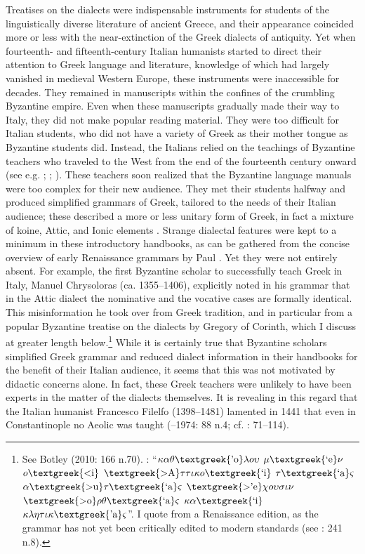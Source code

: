 Treatises on the dialects were indispensable instruments for students of the linguistically diverse literature of ancient Greece, and their appearance coincided more or less with the near-extinction of the Greek dialects of antiquity. Yet when fourteenth- and fifteenth-century Italian humanists started to direct their attention to Greek language and literature, knowledge of which had largely vanished in medieval Western Europe, these instruments were inaccessible for decades. They remained in manuscripts within the confines of the crumbling Byzantine empire. Even when these manuscripts gradually made their way to Italy, they did not make popular reading material. They were too difficult for Italian students, who did not have a variety of Greek as their mother tongue as Byzantine students did. Instead, the Italians relied on the teachings of Byzantine teachers who traveled to the West from the end of the fourteenth century onward (see e.g. \citealt{Harris1995}; \citealt{Botley2010}; \citealt{Wilson2016}). These teachers soon realized that the Byzantine language manuals were too complex for their new audience. They met their students halfway and produced simplified grammars of Greek, tailored to the needs of their Italian audience; these described a more or less unitary form of Greek, in fact a mixture of koine, Attic, and Ionic elements \citep[123]{Ciccolella2008}. Strange dialectal features were kept to a minimum in these introductory handbooks, as can be gathered from the concise overview of early Renaissance grammars by Paul \citet{Botley2010}. Yet they were not entirely absent. For example, the first Byzantine scholar to successfully teach Greek in Italy, Manuel Chrysoloras (ca. 1355–1406), explicitly noted in his grammar that in the Attic dialect the nominative and the vocative cases are formally identical. This misinformation he took over from Greek tradition, and in particular from a popular Byzantine treatise on the dialects by Gregory of Corinth, which I discuss at greater length below.\footnote{See Botley (2010: 166 n.70). \citet[20]{Chrysoloras1512}: “$\kappa \alpha \theta \text{\textgreek{'o}}\lambda o\upsilon $ $\mu \text{\textgreek{`e}}\nu $ $o\text{\textgreek{<i}}$ $\text{\textgreek{>A}}\tau \tau \iota \kappa o\text{\textgreek{`i}}$ $\tau \text{\textgreek{`a}}\varsigma $ $\alpha \text{\textgreek{>u}}\tau \text{\textgreek{`a}}\varsigma $ $\text{\textgreek{>'e}}\chi o\upsilon \sigma \iota \nu $ $\text{\textgreek{>o}}\rho \theta \text{\textgreek{`a}}\varsigma $ $\kappa \alpha \text{\textgreek{`i}}$ $\kappa \lambda \eta \tau \iota \kappa \text{\textgreek{'a}}\varsigma $”. I quote from a Renaissance edition, as the grammar has not yet been critically edited to modern standards (see \citealt{Nuti2013}: 241 n.8).} While it is certainly true that Byzantine scholars simplified Greek grammar and reduced dialect information in their handbooks for the benefit of their Italian audience, it seems that this was not motivated by didactic concerns alone. In fact, these Greek teachers were unlikely to have been experts in the matter of the dialects themselves. It is revealing in this regard that the Italian humanist Francesco Filelfo (1398–1481) lamented in 1441 that even in Constantinople no Aeolic was taught (\citealt{Rotolo1973}–1974: 88 n.4; cf. \citealt{Botley2010}: 71–114).

